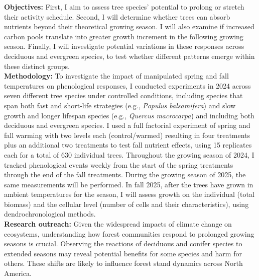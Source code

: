 \documentclass{article}
\begin{document}
\textbf {Objectives:} First, I aim to assess tree species' potential to prolong or stretch their activity schedule. Second, I will determine whether trees can absorb nutrients beyond their theoretical growing season. I will also examine if increased carbon pools translate into greater growth increment in the following growing season. Finally, I will investigate potential variations in these responses across deciduous and evergreen species, to test whether different patterns emerge within these distinct groups.\\ %
\textbf {Methodology:} To investigate the impact of manipulated spring and fall temperatures on phenological responses, I conducted experiments in 2024 across seven different tree species under controlled conditions, including species that span both fast and short-life strategies (e.g., \emph{Populus balsamifera}) and slow growth and longer lifespan species (e.g., \emph{Quercus macrocarpa}) and including both deciduous and evergreen species.\citep{jonsson_annual_2010} I used a full factorial experiment of spring and fall warming with two levels each (control/warmed) resulting in four treatments plus an additional two treatments to test fall nutrient effects, using 15 replicates each for a total of 630 individual trees. %
Throughout the growing season of 2024, I tracked phenological events weekly from the start of the spring treatments through the end of the fall treatments. During the growing season of 2025, the same measurements will be performed. In fall 2025, after the trees have grown in ambient temperatures for the season, I will assess growth on the individual (total biomass) and the cellular level (number of cells and their characteristics), using dendrochronological methods.\\
\textbf{Research outreach:} Given the widespread impacts of climate change on ecosystems, understanding how forest communities respond to prolonged growing seasons is crucial. Observing the reactions of deciduous and conifer species to extended seasons may reveal potential benefits for some species and harm for others. These shifts are likely to influence forest stand dynamics across North America.


\end{document}
